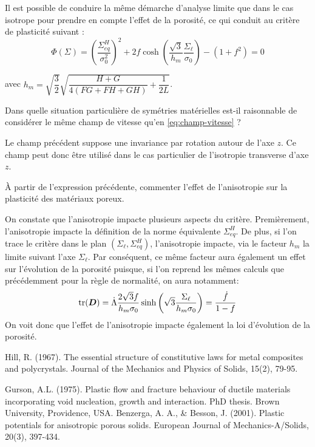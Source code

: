 \documentclass[french,12pt]{exam}
\begin{document}
Il est possible de conduire la même démarche d'analyse limite que dans le cas isotrope pour prendre en compte l'effet de la porosité, ce qui conduit au critère de plasticité suivant \cite{benzerga}:
  \begin{equation}
   \Phi\left( \Sigma     \right)  = \left(  \frac{\Sigma_{eq}^H}{\sigma_0^2} \right)^2 + 2f \cosh{\left(  \frac{\sqrt{3}}{h_m} \frac{\Sigma_\ell}{\sigma_0} \right)} - (1 + f^2) = 0
\label{eq5}
  \end{equation} 

avec $h_m = \sqrt{\dfrac{3}{2}}\sqrt{\dfrac{H+G}{4(FG+FH+GH)} + \dfrac{1}{2L}}$.
\begin{questions}
\question Dans quelle situation particulière de symétries matérielles est-il raisonnable de considérer le même champ de vitesse qu'en \eqref{eq:champ-vitesse} ?
\begin{solution}
Le champ précédent suppose une invariance par rotation autour de l'axe $z$. Ce champ peut donc être utilisé dans le cas particulier de l'isotropie transverse d'axe $z$.
\end{solution}
    \question \`A partir de l'expression précédente, commenter l'effet de l'anisotropie sur la plasticité des matériaux poreux.
\begin{solution}
On constate que l'anisotropie impacte plusieurs aspects du critère. Premièrement, l'anisotropie impacte la définition de la norme équivalente $\Sigma_{eq}^H$. De plus, si l'on trace le critère dans le plan $(\Sigma_\ell,\Sigma_{eq}^H)$, l'anisotropie impacte, via le facteur $h_m$ la limite suivant l'axe $\Sigma_\ell$. Par conséquent, ce même facteur aura également un effet sur l'évolution de la porosité puisque, si l'on reprend les mêmes calculs que précédemment pour la règle de normalité, on aura notamment:
$$\mathrm{tr}(\boldsymbol{D}) = \dot{\Lambda}\dfrac{2\sqrt{3}f}{h_m\sigma_0} \sinh{\left(  \sqrt{3} \frac{\Sigma_\ell}{h_m\sigma_0} \right)} = \dfrac{\dot{f}}{1-f}$$
On voit donc que l'effet de l'anisotropie impacte également la loi d'évolution de la porosité.
\end{solution}
\end{questions}

\begin{thebibliography}{9}
Hill, R. (1967). The essential structure of constitutive laws for metal composites and polycrystals. Journal of the Mechanics and Physics of Solids, 15(2), 79-95.

Gurson, A.L. (1975). Plastic flow and fracture behaviour of ductile materials incorporating void nucleation, growth and interaction. PhD thesis. Brown University, Providence, USA.
Benzerga, A. A.,   \& Besson, J. (2001). Plastic potentials for anisotropic porous solids. European Journal of Mechanics-A/Solids, 20(3), 397-434.


\end{thebibliography}
\end{document}
